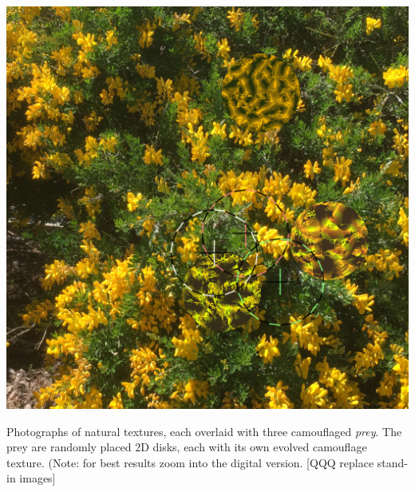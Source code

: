 \documentclass[acmtog]{acmart}
\begin{document}
\begin{teaserfigure}
    \includegraphics[scale=0.24]{images/20220930_step_6093.png}
    \caption{Photographs of natural textures, each overlaid with three camouflaged \textit{prey}. The prey are randomly placed 2D disks, each with its own evolved camouflage texture. (Note: for best results zoom into the digital version. [QQQ replace stand-in images]}
    \label{fig:teaser}
    \vspace{3mm} %
\end{teaserfigure}

\maketitle

\end{document}
